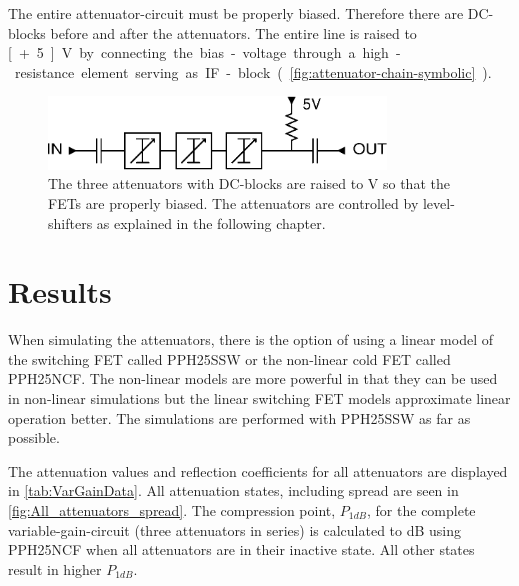 
The entire attenuator-circuit must be properly biased. Therefore there are DC-blocks before and after the attenuators. The entire line is raised to \unit[+5]{V} by connecting the bias-voltage through a high-resistance element serving as IF-block (\autoref{fig:attenuator-chain-symbolic}).

		\begin{figure}[h!]
			\centering
			\includegraphics[width=0.8\textwidth]{fig/attenuators/attenuator-chain-symbolic}
			\caption[The attenuator-circuit schematically]{The three attenuators with DC-blocks are raised to \unit[5]{V} so that the FETs are properly biased. The attenuators are controlled by level-shifters as explained in the following chapter.}\label{fig:attenuator-chain-symbolic}
		\end{figure}

	
	\section{Results}
		
		When simulating the attenuators, there is the option of using a linear model of the switching FET called PPH25SSW or the non-linear cold FET called PPH25NCF. The non-linear models are more powerful in that they can be used in non-linear simulations but the linear switching FET  models approximate linear operation better. The simulations are performed with PPH25SSW as far as possible.		
		
		The attenuation values and reflection coefficients for all attenuators are displayed in \autoref{tab:VarGainData}. All attenuation states, including spread are seen in \autoref{fig:All_attenuators_spread}. The compression point, $P_{1dB}$, for the complete variable-gain-circuit (three attenuators in series) is calculated to \unit[22]{dB} using PPH25NCF when all attenuators are in their inactive state. All other states result in higher $P_{1dB}$.
	
	
	
